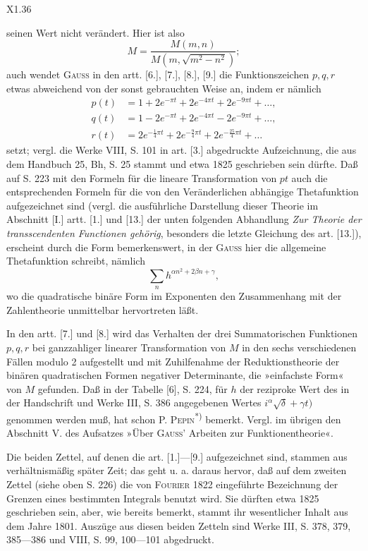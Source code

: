 \par\smallskip\noindent X1.\hfill36\par
\clearpage
{}
\noindent seinen Wert nicht verändert. Hier ist also
\[M=\frac{M(m,n)}{M(m,\sqrt{m^2-n^2})};\]
\noindent auch wendet \textsc{Gauss} in den artt. [6.], [7.], [8.], [9.] die Funktionszeichen $p,q,r$ etwas abweichend von der sonst gebrauchten Weise an, indem er nämlich
\[\begin{aligned}
p(t)&=1+2e^{-\pi t}+2e^{-4\pi t}+2e^{-9\pi t}+\ldots,\\
q(t)&=1-2e^{-\pi t}+2e^{-4\pi t}-2e^{-9\pi t}+\ldots,\\
r(t)&=2e^{-\frac14\pi t}+2e^{-\frac94\pi t}+2e^{-\frac{25}4\pi t}+\ldots
\end{aligned}\]
\noindent setzt; vergl. die Werke VIII, S. 101 in art. [3.] abgedruckte Aufzeichnung, die aus dem Handbuch 25, Bh, S. 25 stammt und etwa 1825 geschrieben sein dürfte. Daß auf S. 223 mit den Formeln für die lineare Transformation von $pt$ auch die entsprechenden Formeln für die von den  Veränderlichen abhängige Thetafunktion aufgezeichnet sind (vergl. die ausführliche Darstellung dieser Theorie im Abschnitt [I.] artt. [1.] und [13.] der unten folgenden Abhandlung \textit{Zur Theorie der transscendenten Functionen gehörig}, besonders die letzte Gleichung des art. [13.]), erscheint durch die Form bemerkenswert, in der \textsc{Gauss} hier die allgemeine Thetafunktion schreibt, nämlich
\[\sum_n h^{\alpha n^2+2\beta n+\gamma},\]
\noindent wo die quadratische binäre Form im Exponenten den Zusammenhang mit der Zahlentheorie unmittelbar hervortreten läßt.
\par\indent In den artt. [7.] und [8.] wird das Verhalten der drei Summatorischen Funktionen $p,q,r$ bei ganzzahliger linearer Transformation von $M$ in den sechs verschiedenen Fällen modulo 2 aufgestellt und mit Zuhilfenahme der Reduktionstheorie der binären quadratischen Formen negativer Determinante, die »einfachste Form« von $M$ gefunden. Daß in der Tabelle [6], S. 224, für $h$ der reziproke Wert des in der Handschrift und Werke III, S. 386 angegebenen Wertes $i^\alpha\surd\delta+\gamma t)$ genommen werden muß, hat schon P. \textsc{Pepin}\textsuperscript{*)} bemerkt. Vergl. im übrigen den Abschnitt V. des Aufsatzes »Über \textsc{Gauss}' Arbeiten zur Funktionentheorie«.
\par\indent Die beiden Zettel, auf denen die art. [1.]—[9.] aufgezeichnet sind, stammen aus verhältnismäßig später Zeit; das geht u. a. daraus hervor, daß auf dem zweiten Zettel (siehe oben S. 226) die von \textsc{Fourier} 1822 eingeführte Bezeichnung der Grenzen eines bestimmten Integrals benutzt wird. Sie dürften etwa 1825 geschrieben sein, aber, wie bereits bemerkt, stammt ihr wesentlicher Inhalt aus dem Jahre 1801. Auszüge aus diesen beiden Zetteln sind Werke III, S. 378, 379, 385—386 und VIII, S. 99, 100—101 abgedruckt.
